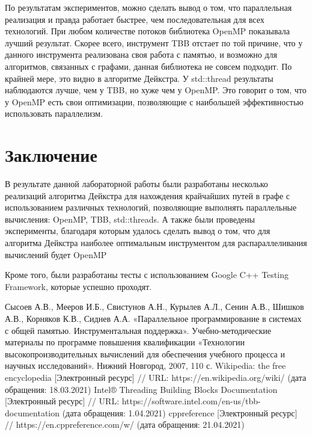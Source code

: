 \documentclass{report}
\begin{document}
\par По результатам экспериментов, можно сделать вывод о том, что параллельная реализация и правда работает быстрее, чем последовательная для всех технологий. При любом количестве потоков библиотека OpenMP показывала лучший результат. Скорее всего, инструмент TBB отстает по той причине, что у данного инструмента реализована своя работа с памятью, и возможно для алгоритмов, связанных с графами, данная библиотека не совсем подходит. По крайней мере, это видно в алгоритме Дейкстра. У std::thread результаты наблюдаются лучше, чем у TBB, но хуже чем у OpenMP. Это говорит о том, что у OpenMP есть свои оптимизации, позволяющие с наибольшей эффективностью использовать параллелизм.
\newpage


\section*{Заключение}
В результате данной лабораторной работы были разработаны несколько реализаций алгоритма Дейкстра для нахождения крайчайших путей в графе с использованием различных технологий, позволяющие выполнять параллельные вычисления: OpenMP, TBB, std::threads. А также были проведены эксперименты, благодаря которым удалось сделать вывод о том, что для алгоритма Дейкстра наиболее оптимальным инструментом для распараллеливания вычислений будет OpenMP
\par Кроме того, были разработаны тесты с использованием Google C++ Testing Framework, которые успешно проходят.
\newpage


\begin{thebibliography}{1}
 Сысоев А.В., Мееров И.Б., Свистунов А.Н., Курылев А.Л., Сенин А.В., Шишков А.В., Корняков К.В., Сиднев А.А. «Параллельное программирование в системах с общей памятью. Инструментальная поддержка». Учебно-методические материалы по программе повышения квалификации «Технологии высокопроизводительных вычислений для обеспечения учебного процесса и научных исследований». Нижний Новгород, 2007, 110 с. 
 Wikipedia: the free encyclopedia [Электронный ресурс] // URL: https://en.wikipedia.org/wiki/ (дата обращения: 18.03.2021)
 Intel® Threading Building Blocks Documentation [Электронный ресурс] // URL: https://software.intel.com/en-us/tbb-documentation (дата обращения: 1.04.2021)
 cppreference [Электронный ресурс] // https://en.cppreference.com/w/ (дата обращения: 21.04.2021)
\end{thebibliography}
\newpage
\end{document}
